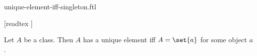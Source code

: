 \documentclass{stex}
\begin{document}
\begin{smodule}{unique-element-iff-singleton.ftl}

  \begin{forthel}

    [readtex ]
  \end{forthel}

  \begin{forthel}
    \begin{proposition}
      Let $A$ be a class.
      Then $A$ has a unique element iff $A = \set{a}$ for some object $a$.
    \end{proposition}
  \end{forthel}
\end{smodule}
\end{document}
